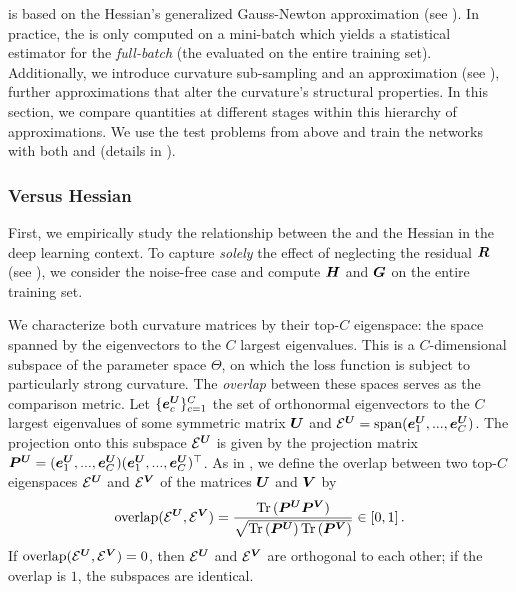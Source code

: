 \vivit is based on the Hessian's generalized Gauss-Newton approximation (see
).
In practice, the \ggn is only computed on a mini-batch which yields a
statistical estimator for the \textit{full-batch} \ggn (\ie the \ggn evaluated
on the entire training set).
Additionally, we introduce curvature sub-sampling and an \mc approximation (see
), \ie further approximations that alter the
curvature's structural properties.
In this section, we compare quantities at different stages within this hierarchy
of approximations. We use the test problems from above and train the networks
with both \sgd and \adam{} (details in ).

\subsubsection{\ggn Versus Hessian}

First, we empirically study the relationship between the \ggn and the Hessian in
the deep learning context. To capture \textit{solely} the effect of neglecting
the residual ${\bm{R}}$ (see ), we consider the noise-free case and
compute ${\bm{H}}$ and ${\bm{G}}$ on the entire training set.

We characterize both curvature matrices by their top-$C$ eigenspace: the space
spanned by the eigenvectors to the $C$
largest eigenvalues. This is a $C$-dimensional subspace of the parameter space
$\Theta$, on which the loss function is subject to particularly strong
curvature. The \textit{overlap} between these spaces serves as the comparison
metric.
Let $\{ {\bm{e}}_c^{\bm{U}} \}_{c=1}^C$ the set of orthonormal eigenvectors to the $C$
largest eigenvalues of some symmetric matrix ${\bm{U}}$ and $\mathcal{E}^{\bm{U}} =
\operatorname{span} ({\bm{e}}_1^{\bm{U}}, ..., {\bm{e}}_C^{\bm{U}})$.
The projection onto this subspace $\mathcal{E}^{\bm{U}}$ is given by the projection
matrix ${\bm{P}}^{\bm{U}} = ({\bm{e}}_1^{\bm{U}}, ..., {\bm{e}}_C^{\bm{U}}) ({\bm{e}}_1^{\bm{U}}, ..., {\bm{e}}_C^{\bm{U}})^\top$.
As in \citet{gurari2018gradient}, we define the overlap between two top-$C$
eigenspaces $\mathcal{E}^{\bm{U}}$ and $\mathcal{E}^{\bm{V}}$ of the matrices ${\bm{U}}$ and
${\bm{V}}$ by \vspace{-2mm}
\begin{equation}
  \text{overlap}(\mathcal{E}^{\bm{U}}, \mathcal{E}^{\bm{V}})
  = \frac{\operatorname{Tr}{}({\bm{P}}^{\bm{U}} {\bm{P}}^{\bm{V}})}
  {\sqrt{\operatorname{Tr}{}({\bm{P}}^{\bm{U}}) \operatorname{Tr}{}({\bm{P}}^{\bm{V}})}}
  \in [0, 1]\, .
  \label{vivit::eq:overlap_eigenspaces}
\end{equation}
If $\text{overlap}(\mathcal{E}^{\bm{U}}, \mathcal{E}^{\bm{V}}) = 0$, then
$\mathcal{E}^{\bm{U}}$ and $\mathcal{E}^{\bm{V}}$ are orthogonal to each other; if the
overlap is $1$, the subspaces are identical.

